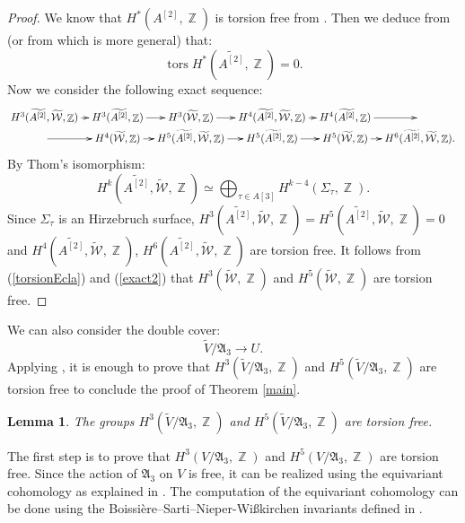 \documentclass[a4paper]{article}
\newtheorem{lemme}{Lemma}
\theoremstyle{remark}
\DeclareMathOperator{\Z}{\mathbb{Z}}
\DeclareMathOperator{\tors}{tors}
\begin{document}
\begin{proof}
We know that $H^*(A^{[2]},\Z)$ is torsion free from \cite[Theorem 2.2]{Totaro}. 
Then we deduce from \cite[Theorem 7.31]{Voisin} (or from \cite[Theorem 4.1]{Li} which is more general) that:
\begin{equation}
\tors H^*\left(\widetilde{A^{[2]}},\Z\right)=0.
\label{torsionEcla}
\end{equation}
Now we consider the following exact sequence:
\begin{equation}
\xymatrix@C7pt@R0pt{ H^3(\widetilde{A^{[2]}},\widetilde{\mathcal{W}},\Z)\ar[r] & H^{3}(\widetilde{A^{[2]}},\Z)\ar[r] & H^{3}(\widetilde{\mathcal{W}},\Z)\ar[r]&H^{4}(\widetilde{A^{[2]}},\widetilde{\mathcal{W}},\Z)\ar[r] & H^{4}(\widetilde{A^{[2]}},\Z)\ar[r] & \\
\ar[r]&H^{4}(\widetilde{\mathcal{W}},\Z)\ar[r]&H^{5}(\widetilde{A^{[2]}},\widetilde{\mathcal{W}},\Z)\ar[r]& H^{5}(\widetilde{A^{[2]}},\Z)\ar[r] & H^{5}(\widetilde{\mathcal{W}},\Z)\ar[r]&H^{6}(\widetilde{A^{[2]}},\widetilde{\mathcal{W}},\Z)
.}
\label{exact2}
\end{equation}
By Thom's isomorphism:
$$H^k(\widetilde{A^{[2]}},\widetilde{\mathcal{W}},\Z)\simeq \bigoplus_{\tau\in A[3]} H^{k-4}(\Sigma_\tau,\Z).$$
Since $\Sigma_\tau$ is an Hirzebruch surface, $H^3(\widetilde{A^{[2]}},\widetilde{\mathcal{W}},\Z)=H^5(\widetilde{A^{[2]}},\widetilde{\mathcal{W}},\Z)=0$
and $H^{4}(\widetilde{A^{[2]}},\widetilde{\mathcal{W}},\Z)$, $H^{6}(\widetilde{A^{[2]}},\widetilde{\mathcal{W}},\Z)$ are torsion free. 
It follows from (\ref{torsionEcla}) and (\ref{exact2}) that $H^3(\widetilde{\mathcal{W}},\Z)$ and $H^5(\widetilde{\mathcal{W}},\Z)$ are torsion free.
\end{proof}
We can also consider the double cover:
$$\widetilde{V}/\mathfrak{A}_3\rightarrow U.$$
Applying \cite[Theorem 5.4 ]{Transfers}, it is enough to prove that $H^3(\widetilde{V}/\mathfrak{A}_3,\Z)$ and $H^5(\widetilde{V}/\mathfrak{A}_3,\Z)$
are torsion free to conclude the proof of Theorem \ref{main}.
\begin{lemme}\label{last}
The groups $H^3(\widetilde{V}/\mathfrak{A}_3,\Z)$ and $H^5(\widetilde{V}/\mathfrak{A}_3,\Z)$ are torsion free.
\end{lemme}
The first step is to prove that $H^3(V/\mathfrak{A}_3,\Z)$ and $H^5(V/\mathfrak{A}_3,\Z)$ are torsion free.
Since the action of $\mathfrak{A}_3$ on $V$ is free, it can be realized using the equivariant cohomology as explained in \cite[Section 4]{Lol}.
The computation of the equivariant cohomology can be done using the Boissi\`ere--Sarti--Nieper-Wi\ss kirchen invariants defined in \cite[Section 2]{SmithTh}. 
\end{document}
